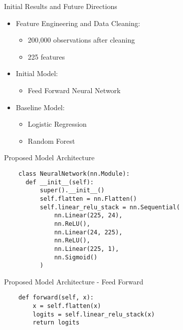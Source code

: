 \documentclass{beamer}
\begin{document}
\begin{frame}{Initial Results and Future Directions}

  \begin{itemize}
    \item Feature Engineering and Data Cleaning: 
      \begin{itemize}
        \item 200,000 observations after cleaning 
        \item 225 features 
      \end{itemize} 
    \item Initial Model:
      \begin{itemize}
        \item Feed Forward Neural Network 
      \end{itemize}
    \item Baseline Model: 
      \begin{itemize}
        \item Logistic Regression
        \item Random Forest 
      \end{itemize} 
  \end{itemize}

\end{frame}

\begin{frame}[fragile]{Proposed Model Architecture}

  \begin{verbatim}
    class NeuralNetwork(nn.Module):
      def __init__(self):
          super().__init__()
          self.flatten = nn.Flatten() 
          self.linear_relu_stack = nn.Sequential( 
              nn.Linear(225, 24), 
              nn.ReLU(), 
              nn.Linear(24, 225), 
              nn.ReLU(), 
              nn.Linear(225, 1),
              nn.Sigmoid()
          )
  \end{verbatim}

\end{frame}

\begin{frame}[fragile]{Proposed Model Architecture - Feed Forward}

  \begin{verbatim}
    def forward(self, x):
        x = self.flatten(x) 
        logits = self.linear_relu_stack(x) 
        return logits
  \end{verbatim} 

\end{frame} 
\end{document}
